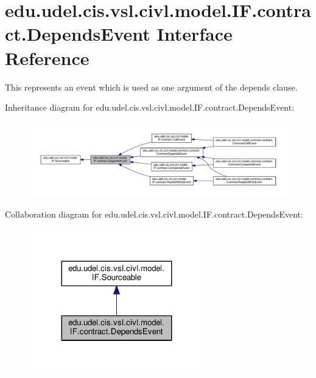 \hypertarget{interfaceedu_1_1udel_1_1cis_1_1vsl_1_1civl_1_1model_1_1IF_1_1contract_1_1DependsEvent}{}\section{edu.\+udel.\+cis.\+vsl.\+civl.\+model.\+I\+F.\+contract.\+Depends\+Event Interface Reference}
\label{interfaceedu_1_1udel_1_1cis_1_1vsl_1_1civl_1_1model_1_1IF_1_1contract_1_1DependsEvent}


This represents an event which is used as one argument of the {\ttfamily depends} clause.  




Inheritance diagram for edu.\+udel.\+cis.\+vsl.\+civl.\+model.\+I\+F.\+contract.\+Depends\+Event\+:
\nopagebreak
\begin{figure}[H]
\begin{center}
\leavevmode
\includegraphics[width=350pt]{interfaceedu_1_1udel_1_1cis_1_1vsl_1_1civl_1_1model_1_1IF_1_1contract_1_1DependsEvent__inherit__graph}
\end{center}
\end{figure}


Collaboration diagram for edu.\+udel.\+cis.\+vsl.\+civl.\+model.\+I\+F.\+contract.\+Depends\+Event\+:
\nopagebreak
\begin{figure}[H]
\begin{center}
\leavevmode
\includegraphics[width=215pt]{interfaceedu_1_1udel_1_1cis_1_1vsl_1_1civl_1_1model_1_1IF_1_1contract_1_1DependsEvent__coll__graph}
\end{center}
\end{figure}
